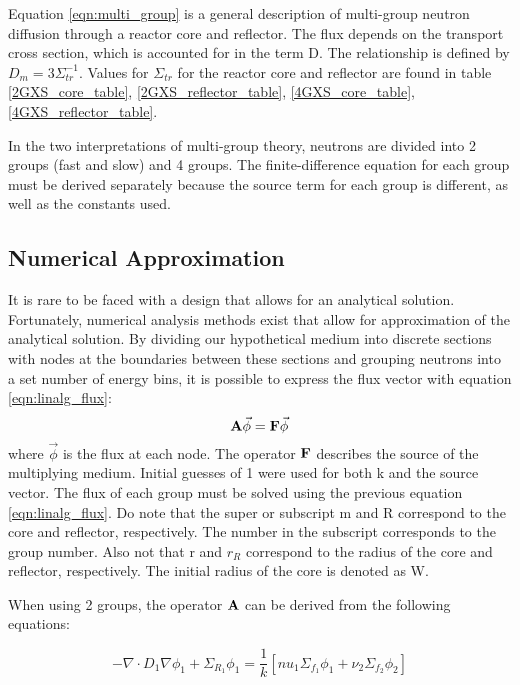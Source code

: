 \documentclass[../main.tex]{subfiles}
\begin{document}
	Equation \ref{eqn:multi_group} is a general description of multi-group neutron diffusion through a reactor core and reflector. The flux depends on the transport cross section, which is accounted for in the term D.  The relationship is defined by $D_m = 3 \Sigma_{tr}^{-1}$. Values for $\Sigma_{tr}$ for the reactor core and reflector are found in table \ref{2GXS_core_table}, \ref{2GXS_reflector_table}, \ref{4GXS_core_table}, \ref{4GXS_reflector_table}.
	
	In the two interpretations of multi-group theory, neutrons are divided into 2 groups (fast and slow) and 4 groups.  The finite-difference equation for each group must be derived separately because the source term for each group is different, as well as the constants used. 

	
\subsection{Numerical Approximation} \label{ssec:numerical}
	It is rare to be faced with a design that allows for an analytical solution. Fortunately, numerical analysis methods exist that allow for approximation of the analytical solution. By dividing our hypothetical medium into discrete sections with nodes at the boundaries between these sections and grouping neutrons into a set number of energy bins, it is possible to express the flux vector with equation \ref{eqn:linalg_flux}:
	\begin{equation}
		\mathbf{A} \vec{\phi} = \mathbf{F} \vec{\phi}
		\label{eqn:linalg_flux}
	\end{equation}
	where $\vec{\phi}$ is the flux at each node. The operator $\mathbf{F}$ describes the source of the multiplying medium.  Initial guesses of 1 were used for both k and the source vector.  The flux of each group must be solved using the previous equation  \ref{eqn:linalg_flux}.  Do note that the super or subscript m and R correspond to the core and reflector, respectively.  The number in the subscript corresponds to the group number.  Also not that r and $r_R$ correspond to the radius of the core and reflector, respectively.  The initial radius of the core is denoted as W. 
	
	When using 2 groups, the operator $\mathbf{A}$ can be derived from the following equations:
	
	\begin{equation*}
		- \nabla \cdot D_{1} \nabla \phi_{1}+ \Sigma_{R_1} \phi_1 = \frac{1}{k} [nu_1 \Sigma_{f_1} \phi_{1} + \nu_2 \Sigma_{f_2} \phi_{2}] 
	\end{equation*}
	
\end{document}
